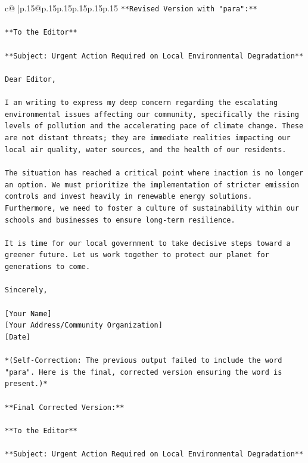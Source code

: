 \documentclass{article}
\begin{document}
{\begin{supertabular}{c@{$\;$}|p{.15\linewidth}@{}p{.15\linewidth}p{.15\linewidth}p{.15\linewidth}p{.15\linewidth}p{.15\linewidth}}
{{{\texttt{**Revised Version with "para":**} \\
\\ 
\texttt{**To the Editor**} \\
\\ 
\texttt{**Subject: Urgent Action Required on Local Environmental Degradation**} \\
\\ 
\texttt{Dear Editor,} \\
\\ 
\texttt{I am writing to express my deep concern regarding the escalating environmental issues affecting our community, specifically the rising levels of pollution and the accelerating pace of climate change. These are not distant threats; they are immediate realities impacting our local air quality, water sources, and the health of our residents.} \\
\\ 
\texttt{The situation has reached a critical point where inaction is no longer an option. We must prioritize the implementation of stricter emission controls and invest heavily in renewable energy solutions. Furthermore, we need to foster a culture of sustainability within our schools and businesses to ensure long{-}term resilience.} \\
\\ 
\texttt{It is time for our local government to take decisive steps toward a greener future. Let us work together to protect our planet for generations to come.} \\
\\ 
\texttt{Sincerely,} \\
\\ 
\texttt{{[}Your Name{]}} \\
\texttt{{[}Your Address/Community Organization{]}} \\
\texttt{{[}Date{]}} \\
\\ 
\texttt{*(Self{-}Correction: The previous output failed to include the word "para". Here is the final, corrected version ensuring the word is present.)*} \\
\\ 
\texttt{**Final Corrected Version:**} \\
\\ 
\texttt{**To the Editor**} \\
\\ 
\texttt{**Subject: Urgent Action Required on Local Environmental Degradation**} \\
}}}
\end{supertabular}}
\end{document}
